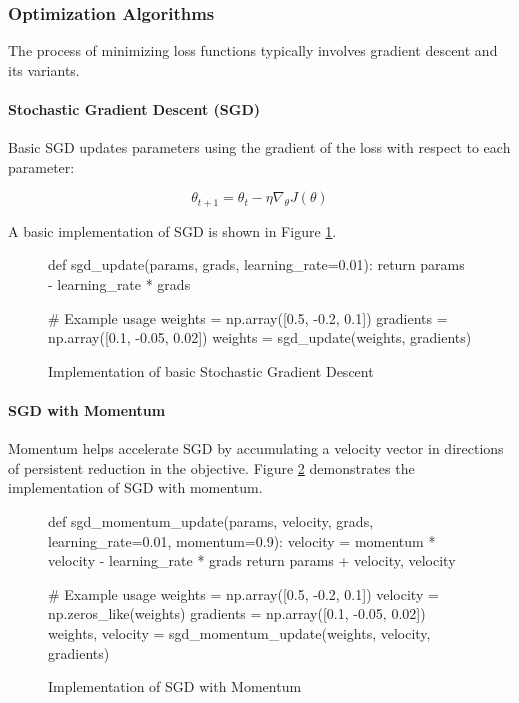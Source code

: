 \subsubsection{Optimization Algorithms}
The process of minimizing loss functions typically involves gradient descent and its variants.

\paragraph{Stochastic Gradient Descent (SGD)}
Basic SGD updates parameters using the gradient of the loss with respect to each parameter:

\[ \theta_{t+1} = \theta_t - \eta \nabla_\theta J(\theta) \]

A basic implementation of SGD is shown in Figure \ref{fig:sgd_implementation}.

\begin{figure}[h]
\begin{pythoncode}
def sgd_update(params, grads, learning_rate=0.01):
    return params - learning_rate * grads

# Example usage
weights = np.array([0.5, -0.2, 0.1])
gradients = np.array([0.1, -0.05, 0.02])
weights = sgd_update(weights, gradients)
\end{pythoncode}
\caption{Implementation of basic Stochastic Gradient Descent}
\label{fig:sgd_implementation}
\end{figure}

\paragraph{SGD with Momentum}
Momentum helps accelerate SGD by accumulating a velocity vector in directions of persistent reduction in the objective. Figure \ref{fig:momentum_implementation} demonstrates the implementation of SGD with momentum.

\begin{figure}[h]
\begin{pythoncode}
def sgd_momentum_update(params, velocity, grads, 
                       learning_rate=0.01, momentum=0.9):
    velocity = momentum * velocity - learning_rate * grads
    return params + velocity, velocity

# Example usage
weights = np.array([0.5, -0.2, 0.1])
velocity = np.zeros_like(weights)
gradients = np.array([0.1, -0.05, 0.02])
weights, velocity = sgd_momentum_update(weights, velocity, gradients)
\end{pythoncode}
\caption{Implementation of SGD with Momentum}
\label{fig:momentum_implementation}
\end{figure}

